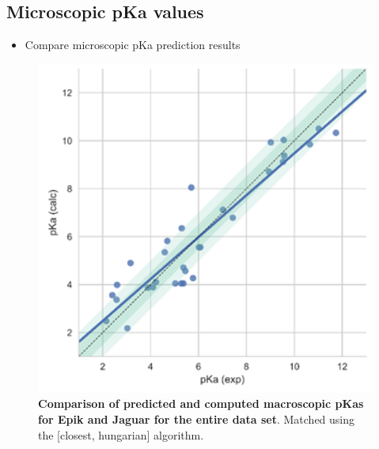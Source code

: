 \documentclass[9pt,lineno]{elife}
\begin{document}
\subsection{Microscopic pKa values}
\begin{itemize}
    \item Compare microscopic pKa prediction results
\end{itemize}
\begin{figure}[H]
    \centering
    \includegraphics[]{correlationplot.png}
    \caption{{\bf Comparison of predicted and computed macroscopic pKas for Epik and Jaguar for the entire data set}.
    Matched using the [closest, hungarian] algorithm.}
    \label{fig:correlation-micro}
\end{figure}
\end{document}
